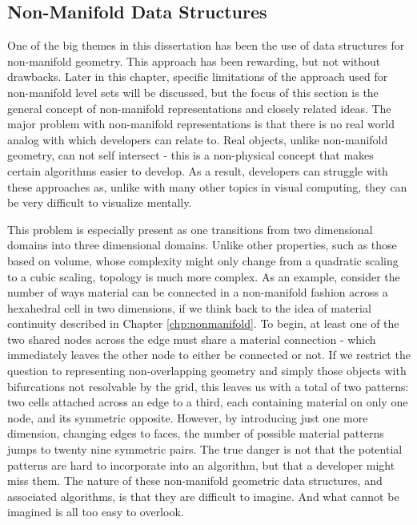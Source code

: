\subsection{Non-Manifold Data Structures}

One of the big themes in this dissertation has been the use of
data structures for non-manifold geometry. This approach has been
rewarding, but not without drawbacks. Later in this chapter, specific
limitations of the approach used for non-manifold level sets will be
discussed, but the focus of this section is the general concept of
non-manifold representations and closely related ideas. The major
problem with non-manifold representations is that there is no real
world analog with which developers can relate to. Real objects, unlike
non-manifold geometry, can not self intersect - this is a non-physical
concept that makes certain algorithms easier to develop. As a result,
developers can struggle with these approaches as, unlike with many other
topics in visual computing, they can be very difficult to visualize
mentally.

This problem is especially present as one transitions from two
dimensional domains into three dimensional domains. Unlike other
properties, such as those based on volume, whose complexity might only
change from a quadratic scaling to a cubic scaling, topology is much
more complex. As an example, consider the number of ways material can
be connected in a non-manifold fashion across a hexahedral cell in two
dimensions, if we think back to the idea of material continuity
described in Chapter \ref{chp:nonmanifold}. To begin, at least one of
the two shared nodes across the edge must share a material connection
- which immediately leaves the other node to either be connected or
not. If we restrict the question to representing non-overlapping
geometry and simply those objects with bifurcations not resolvable by
the grid, this leaves us with a total of two patterns: two cells
attached across an edge to a third, each containing material on only
one node, and its symmetric opposite. However, by introducing just one more
dimension, changing edges to faces, the number of possible material
patterns jumps to twenty nine symmetric pairs. The true danger is not
that the potential patterns are hard to incorporate into an algorithm,
but that a developer might miss them. The nature of these non-manifold
geometric data structures, and associated algorithms, is that they are
difficult to imagine. And what cannot be imagined is all too easy to
overlook.

